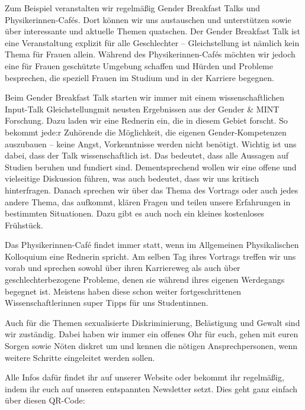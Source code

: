 \begin{multicols}{2}
Zum Beispiel veranstalten wir regelmäßig Gender Breakfast Talks und Physikerinnen-Cafés. Dort können wir uns austauschen und unterstützen sowie über interessante und aktuelle Themen quatschen. Der Gender Breakfast Talk ist eine Veranstaltung explizit für alle Geschlechter – Gleichstellung ist nämlich kein Thema für Frauen allein. Während des Physikerinnen-Cafés möchten wir jedoch eine für Frauen geschützte Umgebung schaffen und Hürden und Probleme besprechen, die speziell Frauen im Studium und in der Karriere begegnen.

Beim Gender Breakfast Talk starten wir immer mit einem wissenschaftlichen Input-Talk Gleichstellungmit neusten Ergebnissen aus der Gender \& MINT Forschung. Dazu laden wir eine Rednerin ein, die in diesem Gebiet forscht. So bekommt jede:r Zuhörende die Möglichkeit, die eigenen Gender-Kompetenzen auszubauen – keine Angst, Vorkenntnisse werden nicht benötigt. Wichtig ist uns dabei, dass der Talk wissenschaftlich ist. Das bedeutet, dass alle Aussagen auf Studien beruhen und fundiert sind. Dementsprechend wollen wir eine offene und vielseitige Diskussion führen, was auch bedeutet, dass wir uns kritisch hinterfragen. Danach sprechen wir über das Thema des Vortrags oder auch jedes andere Thema, das aufkommt, klären Fragen und teilen unsere Erfahrungen in bestimmten Situationen. Dazu gibt es auch noch ein kleines kostenloses Frühstück.

Das Physikerinnen-Café findet immer statt, wenn im Allgemeinen Physikalischen Kolloquium eine Rednerin spricht. Am selben Tag ihres Vortrags treffen wir uns vorab und sprechen sowohl über ihren Karriereweg als auch über geschlechterbezogene Probleme, denen sie während ihres eigenen Werdegangs begegnet ist. Meistens haben diese schon weiter fortgeschrittenen Wissenschaftlerinnen super Tipps für uns Studentinnen.

Auch für die Themen sexualisierte Diskriminierung, Belästigung und Gewalt sind wir zuständig. Dabei haben wir immer ein offenes Ohr für euch, gehen mit euren Sorgen sowie Nöten diskret um und kennen die nötigen Ansprechpersonen, wenn weitere Schritte eingeleitet werden sollen.

\begin{multicols}{2}
Alle Infos dafür findet ihr auf unserer \mbox{Website\footnotemark} oder bekommt ihr regelmäßig, indem ihr euch auf unseren entspannten Newsletter setzt. Dies geht ganz einfach über diesen QR-Code:
\end{multicols}


\end{multicols}
